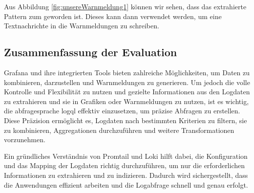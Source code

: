 Aus Abbildung \ref{fig:unsereWarnmeldung1} können wir sehen, dass das extrahierte Pattern zum  geworden ist. Dieses kann dann verwendet werden, um eine Textnachrichte in die Warnmeldungen zu schreiben.


\newpage
\subsection{Zusammenfassung der Evaluation}
Grafana und ihre integrierten Tools bieten zahlreiche Möglichkeiten, um Daten zu kombinieren, darzustellen und Warnmeldungen zu generieren. Um jedoch die volle Kontrolle und Flexibilität zu nutzen und gezielte Informationen aus den Logdaten zu extrahieren und sie in Grafiken oder Warnmeldungen zu nutzen, ist es wichtig, die \gls{abfragesprache} \gls{logql} effektiv einzusetzen, um präzise Abfragen zu erstellen. Diese Präzision ermöglicht es, Logdaten nach bestimmten Kriterien zu filtern, sie zu kombinieren, Aggregationen durchzuführen und weitere Transformationen vorzunehmen.

Ein gründliches Verständnis von Promtail und Loki hilft dabei, die Konfiguration und das Mapping der Logdaten richtig durchzuführen, um nur die erforderlichen Informationen zu extrahieren und zu indizieren. Dadurch wird sichergestellt, dass die Anwendungen effizient arbeiten und die Logabfrage schnell und genau erfolgt.


